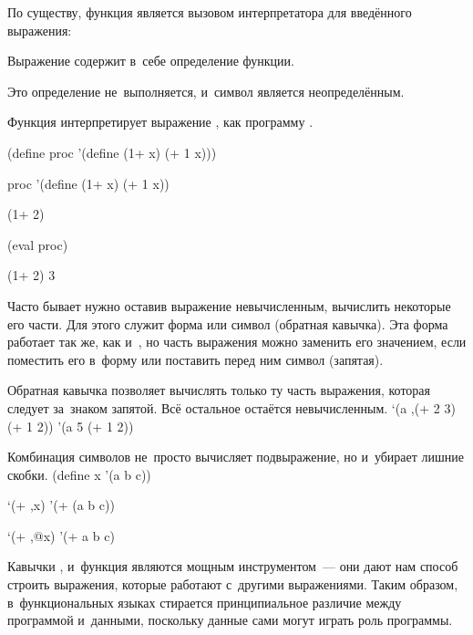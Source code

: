 По существу, функция  является вызовом интерпретатора \Scheme для введённого выражения:

\begin{example}{Выражение  содержит в~себе определение функции.

Это определение не~выполняется,  и~символ  является неопределённым.

Функция  интерпретирует  выражение , как программу \Scheme.}
\begin{ExampleCode}
(define proc
  '(define (1+ x)
       (+ 1 x)))
\end{ExampleCode}

\REPL
  {proc}
  {'(define (1+ x) (+ 1 x))}

\REPLin
  {(1+ 2)}


\REPLin
  {(eval proc)}

\REPL
  {(1+ 2)}
  {3}
\end{example}

Часто бывает нужно оставив выражение невычисленным, вычислить некоторые его части. Для этого служит форма  или символ  (обратная кавычка). Эта форма работает так же, как и~, но часть выражения можно заменить его значением, если поместить его в~форму  или поставить перед ним символ \s{,} (запятая).

\begin{example}{Обратная кавычка позволяет вычислять только ту часть выражения, которая следует за~знаком запятой. Всё остальное остаётся невычисленным.}
\REPL
  {`(a ,(+ 2 3) (+ 1 2))}
  {'(a 5 (+ 1 2))}
\end{example}

\begin{example}{Комбинация символов  не~просто вычисляет подвыражение, но и~убирает лишние скобки.}
\REPLin
  {(define x '(a b c))}

\REPL
  {`(+ ,x)}
  {'(+ (a b c))}

\REPL
  {`(+ ,@x)}
  {'(+ a b c)}
\end{example}

Кавычки ,  и~функция  являются мощным инструментом~--- они дают нам способ строить выражения, которые работают с~другими выражениями. Таким образом, в~функциональных языках стирается принципиальное различие между программой и~данными, поскольку данные сами могут играть роль программы.


